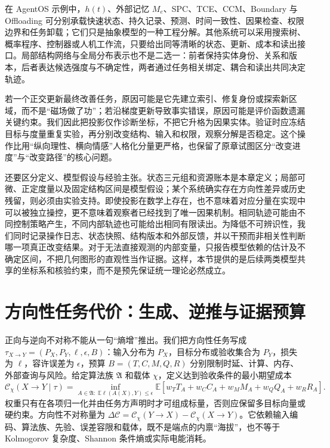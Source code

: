 在 AgentOS 示例中，$h(t)$、外部记忆 $M_e$、SPC、TCE、CCM、Boundary 与 Offloading 可分别承载快速状态、持久记录、预测、时间一致性、因果检查、权限边界和任务卸载；它们只是抽象模型的一种工程分解。其他系统可以采用搜索树、概率程序、控制器或人机工作流，只要给出同等清晰的状态、更新、成本和读出接口。局部结构网络与全局分布表示也不是二选一：前者保持实体身份、关系和版本，后者表达候选强度与不确定性，两者通过任务相关绑定、耦合和读出共同决定轨迹。

若一个正交更新最终改善任务，原因可能是它先建立索引、修复身份或探索新区域，而不是“磁场做了功”；若沿梯度更新导致事实错误，原因可能是评价函数遗漏关键约束。我们因此把投影仅作诊断坐标，不把它升格为因果实体。验证时应冻结目标与度量重复实验，再分别改变结构、输入和权限，观察分解是否稳定。这个操作比用“纵向理性、横向情感”人格化分量更严格，也保留了原章试图区分“改变进度”与“改变路径”的核心问题。

还要区分定义、模型假设与经验主张。状态三元组和资源账本是本章定义；局部可微、正定度量以及固定结构区间是模型假设；某个系统确实存在方向性差异或历史残留，则必须由实验支持。即使投影在数学上存在，也不意味着对应分量在实现中可以被独立操控，更不意味着观察者已经找到了唯一因果机制。相同轨迹可能由不同控制策略产生，不同内部轨迹也可能给出相同有限读出。为降低不可辨识性，我们同时记录操作日志、状态快照、结构版本和外部反馈，并以干预而非相关性判断哪一项真正改变结果。对于无法直接观测的内部变量，只报告模型依赖的估计及不确定区间，不把几何图形的直观性当作证据。这样，本节提供的是后续两类模型共享的坐标系和核验约束，而不是预先保证统一理论必然成立。

\section{方向性任务代价：生成、逆推与证据预算}
\label{sec:epiplexity_electric}

正向与逆向不对称不能从一句“熵增”推出。我们把方向性任务写成 $\tau_{X\to Y}=(P_X,P_Y,\ell,\epsilon,B)$：输入分布为 $P_X$，目标分布或验收集合为 $P_Y$，损失为 $\ell$，容许误差为 $\epsilon$，预算 $B=(T,C,M,Q,R)$ 分别限制时延、计算、内存、外部查询与风险。给定算法族 $\mathfrak A$ 和载体 $\chi$，定义达到验收条件的最小期望成本
\[
\mathcal C_\chi(X\!\to\!Y\mid\tau)=
\inf_{A\in\mathfrak A:\;\mathbb E\ell(A(X),Y)\le\epsilon}
\mathbb E[w_TT_A+w_CC_A+w_MM_A+w_QQ_A+w_RR_A].
\]
权重只有在各项归一化并由任务方声明时才可组成标量，否则应保留多目标向量或硬约束。方向性不对称量为 $\Delta\mathcal C=\mathcal C_\chi(Y\to X)-\mathcal C_\chi(X\to Y)$。它依赖输入编码、算法族、先验、误差容限和载体，既不是端点的内禀“海拔”，也不等于 Kolmogorov 复杂度、Shannon 条件熵或实际电能消耗。

